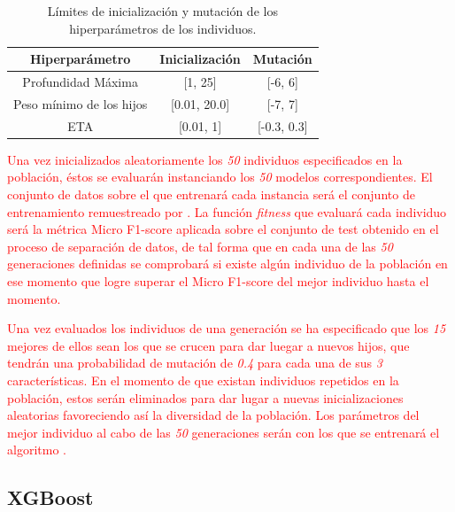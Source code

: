         \begin{table}[H]
            \centering
                \begin{tabular}{ |c|c|c| } 
                \hline
                \textbf{Hiperparámetro} & \textbf{Inicialización} & \textbf{Mutación}\\
                \hline
                    Profundidad Máxima & [1, 25] & [-6, 6]\\ 
                    Peso mínimo de los hijos & [0.01, 20.0] & [-7, 7] \\ 
                    ETA & [0.01, 1] &  [-0.3, 0.3] \\ 
                \hline

                \end{tabular}

            \caption{Límites de inicialización y mutación de los hiperparámetros de los individuos.}
            \label{InitAndMutationLimitsHyperparamsTable}
        \end{table}

        \textcolor{red}{Una vez inicializados aleatoriamente los \textit{50} individuos especificados en la población, éstos se evaluarán instanciando los \textit{50} modelos  correspondientes. El conjunto de datos sobre el que entrenará cada instancia  será el conjunto de entrenamiento remuestreado por . La función \textit{fitness} que evaluará cada individuo será la métrica Micro F1-score aplicada sobre el conjunto de test obtenido en el proceso de separación de datos, de tal forma que en cada una de las \textit{50} generaciones definidas se comprobará si existe algún individuo de la población en ese momento que logre superar el Micro F1-score del mejor individuo hasta el momento.}

        \textcolor{red}{Una vez evaluados los individuos de una generación se ha especificado que los \textit{15} mejores de ellos sean los que se crucen para dar luegar a nuevos hijos, que tendrán una probabilidad de mutación de \textit{0.4} para cada una de sus \textit{3} características. En el momento de que existan individuos repetidos en la población, estos serán eliminados para dar lugar a nuevas inicializaciones aleatorias favoreciendo así la diversidad de la población. Los parámetros del mejor individuo al cabo de las \textit{50} generaciones serán con los que se entrenará el algoritmo .}


    \subsection{XGBoost}


